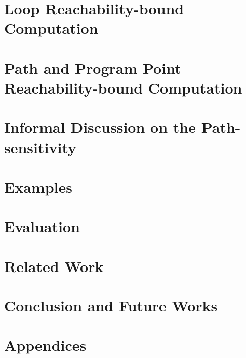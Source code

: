 \documentclass[a4paper,11pt]{article}
\begin{document}
\section{Loop Reachability-bound Computation}
\label{sec:looprb}

\section{Path and Program Point Reachability-bound Computation}
\label{sec:alg-rb}



\section{Informal Discussion on the Path-sensitivity}
\label{sec:thminformal}

\section{Examples}
\label{sec:example}

\section{Evaluation}
\label{sec:eval}

\section{Related Work}
\label{sec:relatedwork}

%
\section{Conclusion and Future Works}
\label{sec:conlusion}

\clearpage




\clearpage

\appendix
{}
\section*{Appendices}

\end{document}
